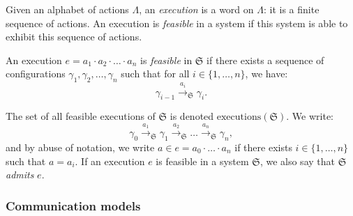 Given an alphabet of actions $\Lambda$, an \textit{execution} is a word on $\Lambda$: it is a finite sequence of actions.  
An execution is \textit{feasible} in a system if this system is able to exhibit this sequence of actions.


\begin{definition}
An execution \( e = a_1 \cdot a_2 \cdot \dots \cdot a_n \) is \textit{feasible} in \( \mathfrak{S} \)  
if there exists a sequence of configurations \( \gamma_1, \gamma_2, \dots, \gamma_n \) such that  
for all \( i \in \{1, \dots, n\} \), we have:
\[
\gamma_{i-1} \xrightarrow{a_i}_{\mathfrak{S}} \gamma_i.
\]
\end{definition}

The set of all feasible executions of \( \mathfrak{S} \) is denoted \( \text{executions}(\mathfrak{S}) \).  
We write:
\[
\gamma_0 \xrightarrow{a_1}_{\mathfrak{S}} \gamma_1 \xrightarrow{a_2}_{\mathfrak{S}} \dots \xrightarrow{a_n}_{\mathfrak{S}} \gamma_n,
\]
and by abuse of notation, we write \( a \in e = a_0 \cdot \dots \cdot a_n \)  
if there exists \( i \in \{1, \dots, n\} \) such that \( a = a_i \).  
If an execution \( e \) is feasible in a system \( \mathfrak{S} \),  
we also say that \( \mathfrak{S} \) \textit{admits} \( e \).



\subsubsection{Communication models}

